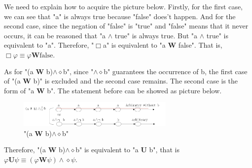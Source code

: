 \documentclass[10pt, conference]{IEEEtran}
\begin{document}
    We need to explain how to acquire the picture below. Firstly, for the first case, we can see that "a" is always true because "false" does't happen. And for the second case, since the negation of "false" is "true" and "false" means that it never occurs, it can be reasoned that "a $\wedge$ true" is always true. But "a $\wedge$ true" is equivalent to "a". Therefore, "$\Box$a" is equivalent to "a \textbf{W} false". That is, $\Box\varphi\equiv \varphi\textbf{W}\text{false}$.
    
   As for "(a \textbf{W} b)$\wedge\diamond$b", since "$\wedge\diamond$b" guarantees the occurrence of b, the first case of "(a \textbf{W} b)" is excluded and the second case remains. The second case is the form of "a \textbf{W} b". The statement before can be showed as picture below.
   \begin{figure}[H]
      \centering
      \includegraphics[width=3.0in]{6.png}
      \caption{"(a \textbf{W} b)$\wedge\diamond$b"}
    \end{figure}
    
    Therefore, "(a \textbf{W} b)$\wedge\diamond$b" is equivalent to "a \textbf{U} b", that is $\varphi\textbf{U}\psi\equiv(\varphi\textbf{W}\psi)\wedge\diamond\psi$.
\end{document}

